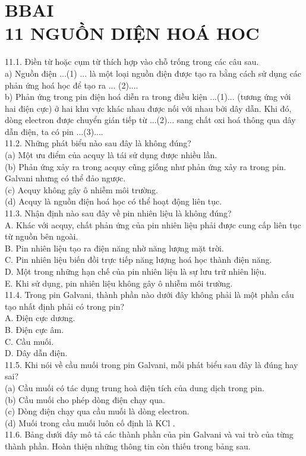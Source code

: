 \documentclass[10pt]{article}
\begin{document}
\section*{BBAI \\
 11 NGUỒN DIỆN HOÁ HOC}
11.1. Điền từ hoặc cụm từ thích hợp vào chỗ trống trong các câu sau.\\
a) Nguồn điện ...(1) ... là một loại nguồn điện được tạo ra bằng cách sử dụng các phản ứng hoá học để tạo ra ... (2)....\\
b) Phản ứng trong pin điện hoá diễn ra trong điều kiện ...(1)... (tương ứng với hai điện cực) ở hai khu vực khác nhau được nối với nhau bởi dây dẫn. Khi đó, dòng electron được chuyển gián tiếp từ ...(2)... sang chất oxi hoá thông qua dây dẫn điện, ta có pin ...(3)....\\
11.2. Những phát biểu nào sau đây là không đúng?\\
(a) Một ưu điểm của acquy là tái sử dụng được nhiều lần.\\
(b) Phản ứng xảy ra trong acquy cũng giống như phản ứng xảy ra trong pin. Galvani nhưng có thể đảo ngược.\\
(c) Acquy không gây ô nhiễm môi trường.\\
(d) Acquy là nguồn điện hoá học có thể hoạt động liên tục.\\
11.3. Nhận định nào sau đây về pin nhiên liệu là không đúng?\\
A. Khác với acquy, chất phản ứng của pin nhiên liệu phải được cung cấp liên tục từ nguồn bên ngoài.\\
B. Pin nhiên liệu tạo ra điện năng nhờ năng lượng mặt trời.\\
C. Pin nhiên liệu biến đồi trực tiếp năng lượng hoá học thành điện năng.\\
D. Một trong những hạn chế của pin nhiên liệu là sự lưu trữ nhiên liệu.\\
E. Khi sử dụng, pin nhiên liệu không gây ô nhiễm môi trường.\\
11.4. Trong pin Galvani, thành phần nào dưới đây không phải là một phần cấu tạo nhất định phải có trong pin?\\
A. Điện cực dương.\\
B. Điện cực âm.\\
C. Cầu muối.\\
D. Dây dẫn điện.\\
11.5. Khi nói về cầu muối trong pin Galvani, mỗi phát biểu sau đây là đúng hay sai?\\
(a) Cầu muối có tác dụng trung hoà điện tích của dung dịch trong pin.\\
(b) Cầu muối cho phép dòng điện chạy qua.\\
(c) Dòng điện chạy qua cầu muối là dòng electron.\\
(d) Muối trong cầu muối luôn cố định là KCl .\\
11.6. Bảng dưới đây mô tả các thành phần của pin Galvani và vai trò của từng thành phần. Hoàn thiện những thông tin còn thiếu trong bảng sau.
\end{document}
